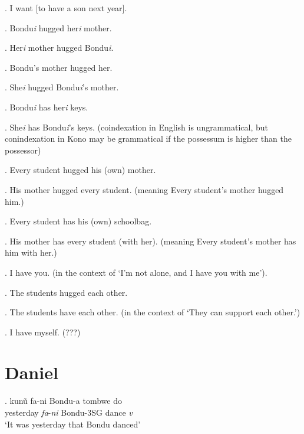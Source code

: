 \documentclass{assets/fieldnotes}
\begin{document}
\ex. I want [to have a son next year].

 \newline


\ex. Bondu\textit{\scriptsize{i}} hugged her\textit{\scriptsize{i}} mother.

\ex. Her\textit{\scriptsize{i}} mother hugged Bondu\textit{\scriptsize{i}}. 

\ex. Bondu's mother hugged her.

\ex. She\textit{\scriptsize{i}} hugged Bondu\textit{\scriptsize{i}}'s mother.

\ex. Bondu\textit{\scriptsize{i}} has her\textit{\scriptsize{i}} keys.

\ex. She\textit{\scriptsize{i}} has Bondu\textit{\scriptsize{i}}'s keys. (coindexation in English is ungrammatical, but conindexation in Kono may be grammatical if the possessum is higher than the possessor)




\ex. Every student hugged his (own) mother.

\ex. His mother hugged every student. (meaning Every student's mother hugged him.)

\ex. Every student has his (own) schoolbag.

\ex. His mother has every student (with her). (meaning Every student's mother has him with her.) 


\ex. I have you. (in the context of `I'm not alone, and I have you with me').

\ex. The students hugged each other.

\ex. The students have each other. (in the context of `They can support each other.')

\ex. I have myself. (???) 


\section{Daniel}
\exg. kunũ fa-ni Bondu-a tombwe do\\
yesterday \textit{fa}-\textit{ni} Bondu-3SG dance \textit{v}\\
`It was yesterday that Bondu danced'
\end{document}
